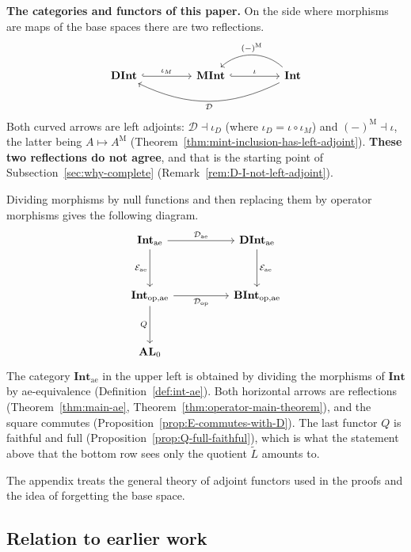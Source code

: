 \medskip
\noindent
\textbf{The categories and functors of this paper.}
On the side where morphisms are maps of the base spaces there are two
reflections.
\[
  \begin{tikzcd}[column sep=4.5em, row sep=3.6em]
    \mathbf{DInt}
      \arrow[r, hook, "\iota_M"]
    & \mathbf{MInt}
      \arrow[r, hook, "\iota"]
    & \mathbf{Int}
      \arrow[l, bend right=42, "(-)^{\mathrm{M}}"']
      \arrow[ll, bend left=26, "\mathcal{D}"]
  \end{tikzcd}
\]
Both curved arrows are left adjoints:
$\mathcal{D}\dashv\iota_{D}$ (where $\iota_{D}=\iota\circ\iota_M$) and
$(-)^{\mathrm{M}}\dashv\iota$, the latter being $A\mapsto A^{\mathrm{M}}$
(Theorem~\ref{thm:mint-inclusion-has-left-adjoint}).
\textbf{These two reflections do not agree}, and that is the starting point of
Subsection~\ref{sec:why-complete}
(Remark~\ref{rem:D-I-not-left-adjoint}).

Dividing morphisms by null functions and then replacing them by operator
morphisms gives the following diagram.
\[
  \begin{tikzcd}[column sep=5em, row sep=3.4em]
    \mathbf{Int}_{\mathrm{ae}}
      \arrow[r, "\mathcal{D}_{\mathrm{ae}}"]
      \arrow[d, "\mathcal{E}_{\mathrm{ae}}"']
    & \mathbf{DInt}_{\mathrm{ae}}
      \arrow[d, "\mathcal{E}_{\mathrm{ae}}"]
    \\
    \mathbf{Int}_{\mathrm{op},\mathrm{ae}}
      \arrow[r, "\mathcal{D}_{\mathrm{op}}"']
      \arrow[d, "Q"']
    & \mathbf{BInt}_{\mathrm{op},\mathrm{ae}}
    \\
    \mathbf{AL}_0
  \end{tikzcd}
\]
The category $\mathbf{Int}_{\mathrm{ae}}$ in the upper left is obtained by
dividing the morphisms of $\mathbf{Int}$ by ae-equivalence
(Definition~\ref{def:int-ae}).
Both horizontal arrows are reflections
(Theorem~\ref{thm:main-ae}, Theorem~\ref{thm:operator-main-theorem}), and the
square commutes (Proposition~\ref{prop:E-commutes-with-D}).
The last functor $Q$ is faithful and full
(Proposition~\ref{prop:Q-full-faithful}), which is what the statement above
that the bottom row sees only the quotient $\widetilde{L}$ amounts to.

\medskip
The appendix treats the general theory of adjoint functors used in the proofs
and the idea of forgetting the base space.

\subsection{Relation to earlier work}\label{sec:prior-work}

